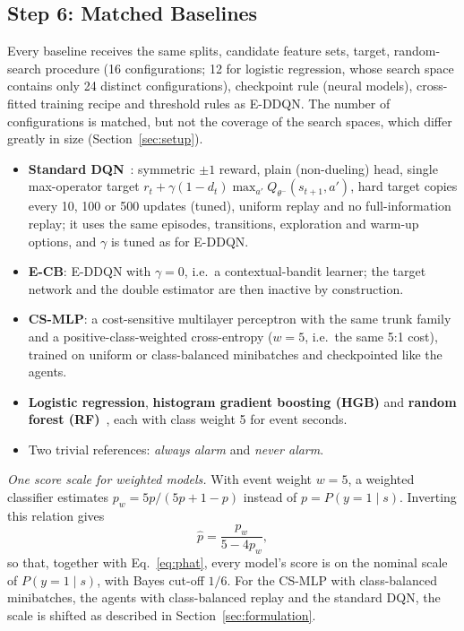 \subsection{Step 6: Matched Baselines}
\label{sec:baselines}
Every baseline receives the same splits, candidate feature sets, target, random-search procedure (16 configurations; 12 for logistic regression, whose search space contains only 24 distinct configurations), checkpoint rule (neural models), cross-fitted training recipe and threshold rules as E-DDQN. The number of configurations is matched, but not the coverage of the search spaces, which differ greatly in size (Section~\ref{sec:setup}).
\begin{itemize}
\item \textbf{Standard DQN}~\cite{mnih2015human}: symmetric $\pm1$ reward, plain (non-dueling) head, single max-operator target $r_t+\gamma(1-d_t)\max_{a'}Q_{\theta^-}(s_{t+1},a')$, hard target copies every 10, 100 or 500 updates (tuned), uniform replay and no full-information replay; it uses the same episodes, transitions, exploration and warm-up options, and $\gamma$ is tuned as for E-DDQN.
\item \textbf{E-CB}: E-DDQN with $\gamma=0$, i.e.\ a contextual-bandit learner; the target network and the double estimator are then inactive by construction.
\item \textbf{CS-MLP}: a cost-sensitive multilayer perceptron with the same trunk family and a positive-class-weighted cross-entropy ($w=5$, i.e.\ the same 5:1 cost), trained on uniform or class-balanced minibatches and checkpointed like the agents.
\item \textbf{Logistic regression}, \textbf{histogram gradient boosting (HGB)} and \textbf{random forest (RF)}~\cite{pedregosa2011sklearn}, each with class weight 5 for event seconds.
\item Two trivial references: \emph{always alarm} and \emph{never alarm}.
\end{itemize}
\emph{One score scale for weighted models.} With event weight $w=5$, a weighted classifier estimates $p_w=5p/(5p+1-p)$ instead of $p=P(y=1\mid s)$. Inverting this relation gives
\begin{equation}
\hat p=\frac{p_w}{5-4p_w},
\label{eq:unweight}
\end{equation}
so that, together with Eq.~\eqref{eq:phat}, every model's score is on the nominal scale of $P(y=1\mid s)$, with Bayes cut-off $1/6$. For the CS-MLP with class-balanced minibatches, the agents with class-balanced replay and the standard DQN, the scale is shifted as described in Section~\ref{sec:formulation}.

